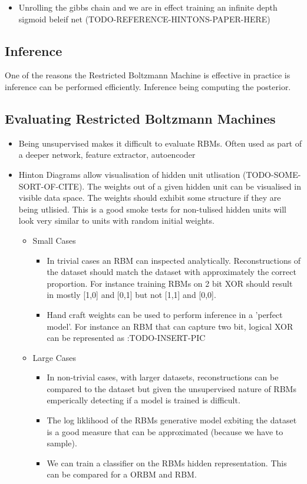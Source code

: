   \begin{itemize}
    \item Unrolling the gibbs chain and we are in effect training an infinite depth sigmoid beleif net (TODO-REFERENCE-HINTONS-PAPER-HERE)
  \end{itemize}

    \subsection{Inference}
    One of the reasons the Restricted Boltzmann Machine is effective in practice is inference can be performed efficiently. Inference being computing the posterior.

    \subsection{Evaluating Restricted Boltzmann Machines}

    \begin{itemize}
      \item Being unsupervised makes it difficult to evaluate RBMs. Often used as part of a deeper network, feature extractor, autoencoder
      \item Hinton Diagrams allow visualisation of hidden unit utlisation (TODO-SOME-SORT-OF-CITE). The weights out of a given hidden unit can be visualised in visible data space. The weights should exhibit some structure if they are being utlisied. This is a good smoke tests for non-tulised hidden units will look very similar to units with random initial weights.
      \begin{itemize}
        \item Small Cases
        \begin{itemize}
          \item In trivial cases an RBM can inspected analytically. Reconstructions of the dataset should match the dataset with approximately the correct proportion. For instance training RBMs on 2 bit XOR should result in mostly [1,0] and [0,1] but not [1,1] and [0,0].
          \item Hand craft weights can be used to perform inference in a 'perfect model'. For instance an RBM that can capture two bit, logical XOR can be represented as :TODO-INSERT-PIC
        \end{itemize}
        \item Large Cases
        \begin{itemize}
          \item In non-trivial cases, with larger datasets, reconstructions can be compared to the dataset but given the unsupervised nature of RBMs emperically detecting if a model is trained is difficult.
          \item The log liklihood of the RBMs generative model exbiting the dataset is a good measure that can be approximated (because we have to sample).
          \item We can train a classifier on the RBMs hidden representation. This can be compared for a ORBM and RBM.
        \end{itemize}
      \end{itemize}
    \end{itemize}


